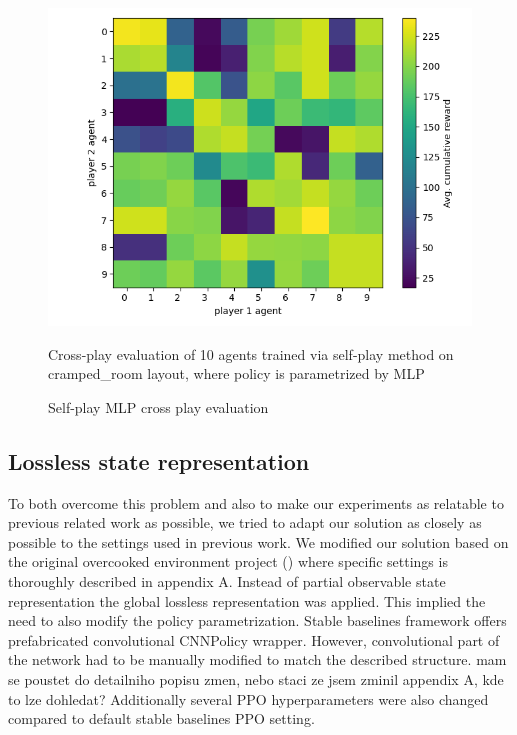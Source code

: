 \begin{figure}[!ht]
    \centering
    \includegraphics*[width=13cm]{../img/MLP_OFF_DIAG_TEST.png}
    \caption{Self-play MLP cross play evaluation}
    \label{MLPSPCrossPlay}
    \medskip
    \small 
    Cross-play evaluation of 10 agents trained via self-play method on cramped\_room layout, where policy is parametrized by MLP

\end{figure}

\subsection*{Lossless state representation}
To both overcome this problem and also to make our experiments as relatable to previous related work as possible, we tried to adapt our solution as closely as possible to the settings used in previous work.
We modified our solution based on the original overcooked environment project (\cite{carroll2020utility}) where specific settings is thoroughly described in appendix A.
Instead of partial observable state representation the global lossless representation was applied.
This implied the need to also modify the policy parametrization.
Stable baselines framework offers prefabricated convolutional CNNPolicy wrapper.
However, convolutional part of the network had to be manually modified to match the described structure. {\color{blue} mam se poustet do detailniho popisu zmen, nebo staci ze jsem zminil appendix A, kde to lze dohledat?}
Additionally several PPO hyperparameters were also changed compared to default stable baselines PPO setting.


